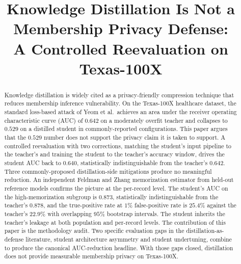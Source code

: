 \documentclass[conference]{IEEEtran}
\begin{document}
\title{Knowledge Distillation Is Not a Membership Privacy Defense:\\
A Controlled Reevaluation on Texas-100X}

\author{
}

\maketitle

\begin{abstract}
Knowledge distillation is widely cited as a privacy-friendly compression technique that reduces membership inference vulnerability. On the Texas-100X healthcare dataset, the standard loss-based attack of Yeom et al.\ achieves an area under the receiver operating characteristic curve (AUC) of $0.642$ on a moderately overfit teacher and collapses to $0.529$ on a distilled student in commonly-reported configurations. This paper argues that the $0.529$ number does not support the privacy claim it is taken to support. A controlled reevaluation with two corrections, matching the student's input pipeline to the teacher's and training the student to the teacher's accuracy window, drives the student AUC back to $0.640$, statistically indistinguishable from the teacher's $0.642$. Three commonly-proposed distillation-side mitigations produce no meaningful reduction. An independent Feldman and Zhang memorization estimator from held-out reference models confirms the picture at the per-record level. The student's AUC on the high-memorization subgroup is $0.873$, statistically indistinguishable from the teacher's $0.878$, and the true-positive rate at $1\%$ false-positive rate is $25.4\%$ against the teacher's $22.9\%$ with overlapping $95\%$ bootstrap intervals. The student inherits the teacher's leakage at both population and per-record levels. The contribution of this paper is the methodology audit. Two specific evaluation gaps in the distillation-as-defense literature, student architecture asymmetry and student undertuning, combine to produce the canonical AUC-reduction headline. With those gaps closed, distillation does not provide measurable membership privacy on Texas-100X.
\end{abstract}
\end{document}

